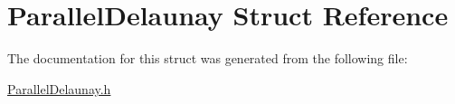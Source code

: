 \hypertarget{structParallelDelaunay}{
\section{ParallelDelaunay Struct Reference}
\label{structParallelDelaunay}
}


The documentation for this struct was generated from the following file:\begin{DoxyCompactItemize}
\item 
\hyperlink{ParallelDelaunay_8h}{ParallelDelaunay.h}\end{DoxyCompactItemize}

